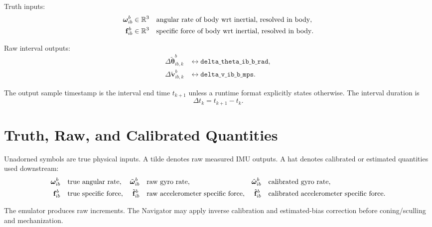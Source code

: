 Truth inputs:
\begin{align}
\boldsymbol{\omega}_{ib}^{b} &\in \mathbb{R}^3
&& \text{angular rate of body wrt inertial, resolved in body},\\
\mathbf{f}_{ib}^{b} &\in \mathbb{R}^3
&& \text{specific force of body wrt inertial, resolved in body}.
\end{align}

Raw interval outputs:
\begin{align}
\Delta\tilde{\boldsymbol{\theta}}_{ib,k}^{b}
&\leftrightarrow
\texttt{delta\_theta\_ib\_b\_rad},\\
\Delta\tilde{\mathbf{v}}_{ib,k}^{b}
&\leftrightarrow
\texttt{delta\_v\_ib\_b\_mps}.
\end{align}

The output sample timestamp is the interval end time $t_{k+1}$ unless a runtime
format explicitly states otherwise. The interval duration is
\begin{equation}
\Delta t_k=t_{k+1}-t_k.
\end{equation}

\section{Truth, Raw, and Calibrated Quantities}

Unadorned symbols are true physical inputs. A tilde denotes raw measured IMU
outputs. A hat denotes calibrated or estimated quantities used downstream:
\begin{align}
\boldsymbol{\omega}_{ib}^{b} &&& \text{true angular rate},&
\tilde{\boldsymbol{\omega}}_{ib}^{b} &&& \text{raw gyro rate},&
\hat{\boldsymbol{\omega}}_{ib}^{b} &&& \text{calibrated gyro rate},\\
\mathbf{f}_{ib}^{b} &&& \text{true specific force},&
\tilde{\mathbf{f}}_{ib}^{b} &&& \text{raw accelerometer specific force},&
\hat{\mathbf{f}}_{ib}^{b} &&& \text{calibrated accelerometer specific force}.
\end{align}

The emulator produces raw increments. The Navigator may apply inverse
calibration and estimated-bias correction before coning/sculling and
mechanization.
